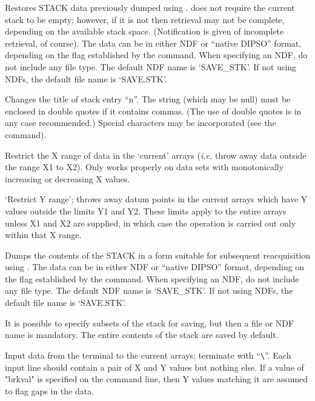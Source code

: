 \begin {description}
Restores STACK data previously dumped using .    does not
require the current stack to be empty; however, if it is not then
retrieval may not be complete, depending on the available stack space.
(Notification is given of incomplete retrieval, of course). The data can
be in either NDF or ``native DIPSO'' format, depending on the flag
established by the   command. When specifying an NDF, do not
include any file type. The default NDF name is `SAVE\_STK'. If not using
NDFs, the default file name is `SAVE.STK'.


Changes the title of stack entry ``n''. The string (which may be null)
must be enclosed in double quotes if it contains commas. (The use of
double quotes is in any case recommended.) Special characters may be
incorporated (see the   command).

Restrict the X range of data in the `current' arrays ({\em i.e.} throw
away data outside the range X1 to X2). Only works properly on data sets
with monotonically increasing or decreasing X values.

`Restrict Y range'; throws away datum points in the current arrays
which have Y values outside the limits Y1 and Y2. These limits apply
to the entire arrays unless X1 and X2 are supplied, in which case the
operation is carried out only within that X range.

Dumps the contents of the STACK in a form suitable for subsequent
reacquisition using .  The data can be in either NDF or ``native
DIPSO'' format, depending on the flag established by the  
command. When specifying an NDF, do not include any file type. The
default NDF name is `SAVE\_STK'. If not using NDFs, the default file name
is `SAVE.STK'.

It is possible to specify subsets of the stack for saving, but then a file or
NDF name is mandatory. The entire contents of the stack are saved by default.

Input data from the terminal to the current arrays; terminate with
``\verb+\+''. Each input line should contain a pair of X and Y
values but nothing else. If a value of "brkval" is specified on the
command line, then Y values matching it are assumed to flag gaps in
the data.


\end{description}
